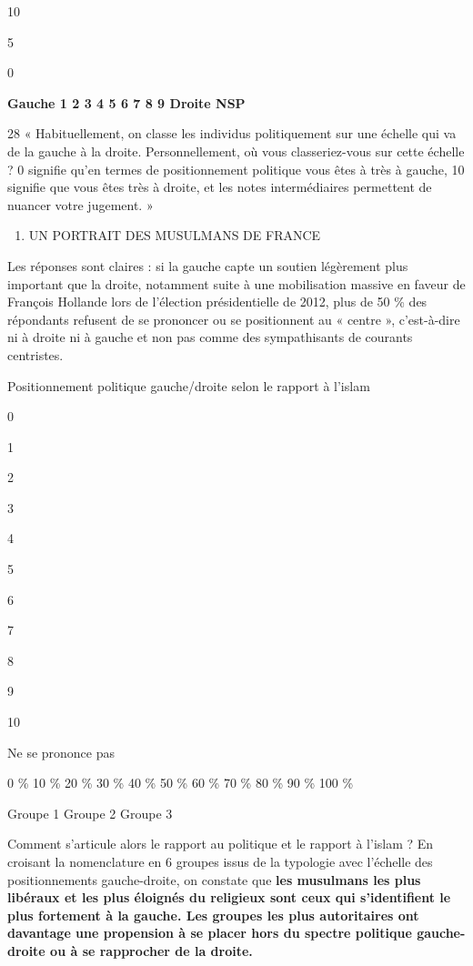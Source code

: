 10

5

0

\textbf{Gauche 1 2 3 4 5 6 7 8 9 Droite NSP}

28 « Habituellement, on classe les individus politiquement sur une
échelle qui va de la gauche à la droite. Personnellement, où vous
classeriez-vous sur cette échelle ? 0 signifie qu'en termes de
positionnement politique vous êtes à très à gauche, 10 signifie que vous
êtes très à droite, et les notes intermédiaires permettent de nuancer
votre jugement. »


\begin{enumerate}
\def\labelenumi{\Roman{enumi}.}
\item
  UN PORTRAIT DES MUSULMANS DE FRANCE
\end{enumerate}


Les réponses sont claires : si la gauche capte un soutien légèrement
plus important que la droite, notamment suite à une mobilisation massive
en faveur de François Hollande lors de l'élection présidentielle de
2012, plus de 50 \% des répondants refusent de se prononcer ou se
positionnent au « centre », c'est-à-dire ni à droite ni à gauche et non
pas comme des sympathisants de courants centristes.


Positionnement politique gauche/droite selon le rapport à l'islam

0

1

2

3

4

5

6

7

8

9

10

Ne se prononce pas


0 \% 10 \% 20 \% 30 \% 40 \% 50 \% 60 \% 70 \% 80 \% 90 \% 100 \%

Groupe 1 Groupe 2 Groupe 3

Comment s'articule alors le rapport au politique et le rapport à l'islam
? En croisant la nomenclature en 6 groupes issus de la typologie avec
l'échelle des positionnements gauche-droite, on constate que \textbf{les
musulmans les plus libéraux et les plus éloignés du religieux sont ceux
qui s'identifient le plus fortement à la gauche. Les groupes les plus
autoritaires ont davantage une propension à se placer hors du spectre
politique gauche-droite ou à se rapprocher de la droite.}



